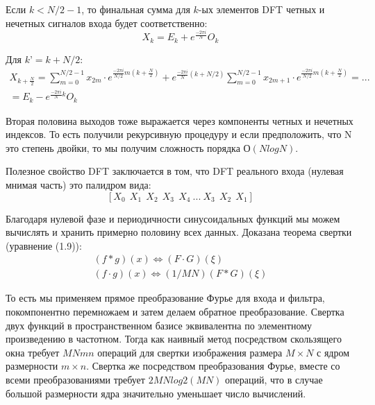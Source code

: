\documentclass[oneside,final,12pt]{extreport}
\begin{document}
Если $k < N/2-1$, то финальная сумма для $k$-ых элементов DFT четных  и нечетных сигналов входа будет соответственно:
\begin{equation}
X_k = E_k + e^{\frac{-2\pi i}{N}}O_k
\end{equation}

Для $k’ = k + N/2$:
\begin{multline}
X_{k+\frac{N}{2}} = \sum_{m=0}^{N/2-1}x_{2m}\cdot e^{\frac{-2\pi i}{N/2}m(k+\frac{N}{2})} + e^{\frac{-2\pi i}{N}(k+N/2)}\sum_{m=0}^{N/2-1}x_{2m+1}\cdot e^{\frac{-2\pi i}{N/2}m(k+\frac{N}{2})} = ...\\  = E_k - e^{\frac{-2\pi i}{N}k}O_k
\end{multline}

Вторая половина выходов тоже выражается через компоненты четных  и нечетных индексов. То есть получили рекурсивную процедуру и если предположить, что N это степень двойки, то мы получим сложность порядка $О(NlogN)$.

Полезное свойство DFT заключается в том, что DFT реального входа (нулевая мнимая часть) это палидром вида:
$$[X_0\ \ X_1\ \ X_2\ \ X_3\ \ X_4\ ... \ X_3\ \ X_2\ \ X_1]$$

Благодаря нулевой фазе и периодичности синусоидальных функций мы можем вычислять и хранить примерно половину всех данных. Доказана теорема свертки (уравнение (1.9)): 
\begin{equation}
\begin{split}
{(f*g)(x)}
\Leftrightarrow 
{(F \cdot G )(\xi)}\\
{(f \cdot g)(x)}
\Leftrightarrow 
{(1/MN)(F*G )(\xi)}
\end{split}
\end{equation}

То есть мы применяем прямое преобразование Фурье для входа и фильтра, покомпонентно перемножаем и затем делаем обратное преобразование. Свертка двух функций в пространственном базисе эквивалентна по элементному произведению в частотном. Тогда как наивный метод посредством скользящего окна требует $MNmn$ операций для свертки изображения размера $M \times N$ с ядром размерности $m \times n$. Свертка же посредством преобразования Фурье, вместе со всеми преобразованиями требует $2MNlog2(MN)$ операций, что в случае большой размерности ядра значительно уменьшает число вычислений.
\end{document}
